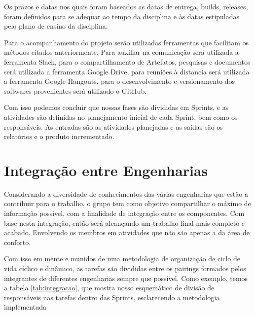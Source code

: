 Os prazos e datas nos quais foram baseados as datas de entrega, builds, releases, foram definidos para se adequar ao tempo da disciplina e às datas estipuladas pelo plano de ensino da disciplina.

Para o acompanhamento do projeto serão utilizadas ferramentas que facilitam os métodos citados anteriormente. Para auxiliar na comunicação será utilizada a ferramenta Slack, para o compartilhamento de Artefatos, pesquisas e documentos será utilizada a ferramenta Google Drive, para reuniões à distancia será utilizada a ferramenta Google Hangouts, para o desenvolvimento  e versionamento dos softwares provenientes será utilizado o GitHub.

Com isso podemos concluir que nossas fases são divididas em Sprints, e as atividades são definidas no planejamento inicial de cada Sprint, bem como os responsáveis. As entradas são as atividades planejadas e as saídas são os relatórios e o produto incrementado.

\section{Integração entre Engenharias}

Considerando a diversidade de conhecimentos das várias engenharias que estão a contribuir para o trabalho, o grupo tem como objetivo  compartilhar o máximo de informação possível, com a finalidade de integração entre os componentes. Com base nesta integração, então será alcançando um trabalho final mais completo e acabado. Envolvendo os membros em atividades que não são apenas a da área de conforto.

Com isso em mente e munidos de uma metodologia de organização de ciclo de vida cíclico e dinâmico, as tarefas são divididas entre os pairings formados pelos integrantes de diferentes engenharias sempre que possível. Como exemplo, temos a tabela \ref{tab:integracao}, que mostra nosso esquemático de divisão de responsáveis nas tarefas dentro das Sprints, esclarecendo a metodologia implementada


